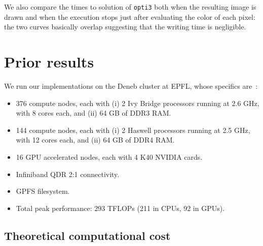 \documentclass[11pt,a4paper]{article}
\begin{document}

We also compare the times to solution of \texttt{opti3} both when the resulting image is drawn and when the execution stops just after evaluating the color of each pixel: the two curves basically overlap suggesting that the writing time is negligible.



%

\vspace{-0.2cm}
\section{Prior results}

We run our implementations on the Deneb cluster at EPFL, whose specifics are~\cite{scitas}: 
\begin{itemize}
\vspace{-0.2cm}
\itemsep0em 
	
\item 376 compute nodes, each with (i) 2 Ivy Bridge processors running at 2.6 GHz, with 8 cores each, and (ii) 64 GB of DDR3 RAM.
\item 144 compute nodes, each with (i) 2 Haswell processors running at 2.5 GHz, with 12 cores each, and (ii) 64 GB of DDR4 RAM.
\item 16 GPU accelerated nodes, each with 4 K40 NVIDIA cards.
\item Infiniband QDR 2:1 connectivity.
\item GPFS filesystem.
\item Total peak performance: 293 TFLOPs (211 in CPUs, 92 in GPUs).
\end{itemize}

\vspace{-0.5cm}
\subsection{Theoretical computational cost}
\end{document}
